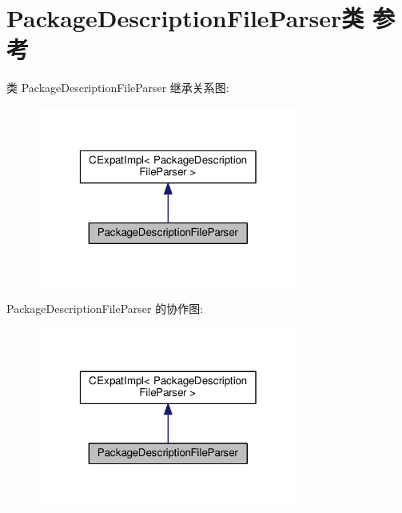 \hypertarget{class_package_description_file_parser}{\section{Package\+Description\+File\+Parser类 参考}
\label{class_package_description_file_parser}
}


类 Package\+Description\+File\+Parser 继承关系图\+:
\nopagebreak
\begin{figure}[H]
\begin{center}
\leavevmode
\includegraphics[width=244pt]{class_package_description_file_parser__inherit__graph}
\end{center}
\end{figure}


Package\+Description\+File\+Parser 的协作图\+:
\nopagebreak
\begin{figure}[H]
\begin{center}
\leavevmode
\includegraphics[width=244pt]{class_package_description_file_parser__coll__graph}
\end{center}
\end{figure}
